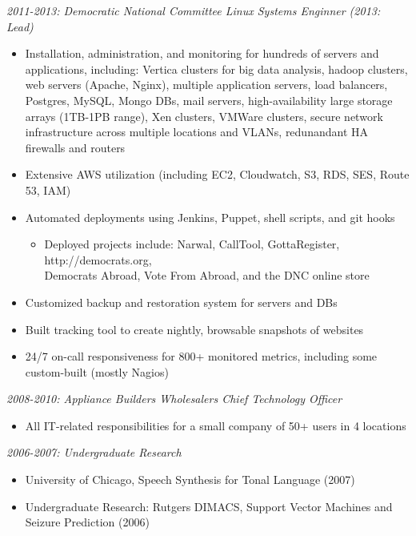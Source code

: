 \documentclass[line]{res} %
\begin{document}
\begin{resume}
    {\sl 2011-2013: Democratic National Committee Linux Systems Enginner (2013: Lead)}
        \begin{itemize}
            \item Installation, administration, and monitoring for hundreds of servers and applications, including: Vertica clusters for big data analysis, hadoop clusters, web servers (Apache, Nginx), multiple application servers, load balancers, Postgres, MySQL, Mongo DBs, mail servers, high-availability large storage arrays (1TB-1PB range), Xen clusters, VMWare clusters, secure network infrastructure across multiple locations and VLANs, redunandant HA firewalls and routers
            \item Extensive AWS utilization (including EC2, Cloudwatch, S3, RDS, SES, Route 53, IAM)
            \item Automated deployments using Jenkins, Puppet, shell scripts, and git hooks
                \begin{itemize}
                    \item Deployed projects include: Narwal, CallTool, GottaRegister, http://democrats.org, \\Democrats Abroad, Vote From Abroad, and the DNC online store
                \end{itemize}
            \item Customized backup and restoration system for servers and DBs
            \item Built tracking tool to create nightly, browsable snapshots of websites
            \item 24/7 on-call responsiveness for 800+ monitored metrics, including some custom-built (mostly Nagios)
        \end{itemize}


{\sl 2008-2010: Appliance Builders Wholesalers Chief Technology Officer} 
    \begin{itemize} 
        \item All IT-related responsibilities for a small company of 50+ users in 4 locations
    \end{itemize}

{\sl 2006-2007: Undergraduate Research}
    \begin{itemize} 
        \item University of Chicago, Speech Synthesis for Tonal Language (2007)
        \item Undergraduate Research: Rutgers DIMACS, Support Vector Machines and Seizure Prediction (2006)
    \end{itemize}


\end{resume}
\end{document}
